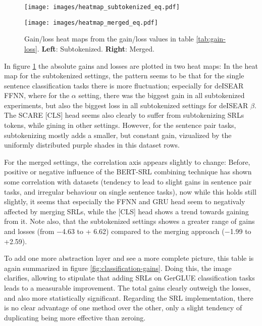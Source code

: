 \begin{figure}
  \begin{minipage}{0.45\linewidth}
  \vspace{0pt}
    \texttt{[image: images/heatmap\_subtokenized\_eq.pdf]}
  \end{minipage}
  \hfill
  \begin{minipage}{0.45\linewidth}
  \vspace{0pt}
    \texttt{[image: images/heatmap\_merged\_eq.pdf]}
  \end{minipage}
  \label{fig:heatmap-gains}
  \caption[Heatmaps subtokenizd and merged]{Gain/loss heat maps from the gain/loss values in table \ref{tab:gain-loss}. \textbf{Left}: Subtokenized. \textbf{Right}: Merged.}
\end{figure}

In figure \ref{fig:heatmap-gains} the absolute gains and losses are plotted in two heat maps:
In the heat map for the subtokenized settings, the pattern seems to be that for the single
sentence classification tasks there is more fluctuation; especially for deISEAR FFNN, where
for the $\alpha$ setting, there was the biggest gain in all subtokenized experiments, but
also the biggest loss in all subtokenized settings for deISEAR $\beta$. The SCARE [CLS] head
seems also clearly to suffer from subtokenizing SRLs tokens, while gining in other settings.
However, for the sentence pair tasks, subtokenizing mostly adds a smaller, but constant gain,
vizualized by the uniformly distributed purple shades in this dataset rows.

For the merged settings, the correlation axis appears slightly to change: Before, positive or
negative influence of the BERT-SRL combining technique has shown some correlation with datasets
(tendency to lead to slight gains in sentence pair tasks, and irregular behaviour on single
sentence tasks), now while this holds still slightly, it seems that especially the FFNN and GRU
head seem to negativaly affected by merging SRLs, while the [CLS] head shows a trend towards
gaining from it. Note also, that the subtokenized settings showes a greater range of gains and
losses (from $-$4.63 to + 6.62) compared to the merging approach ($-$1.99 to +2.59).

To add one more abstraction layer and see a more complete picture, this table is again
summarized in figure \ref{fig:classification-gains}. Doing this, the image
clarifies, allowing to stipulate that adding SRLs on GerGLUE classification tasks
leads to a measurable improvement. The total gains clearly outweigh the losses, and also
more statistically significant. Regarding the SRL implementation, there is no clear advantage
of one method over the other, only a slight tendency of duplicating being more effective
than zeroing.


